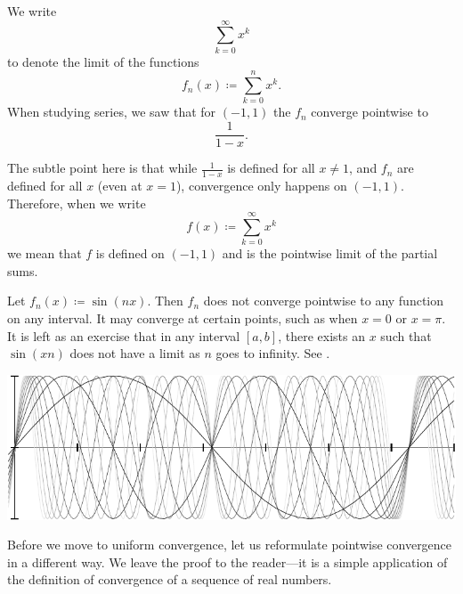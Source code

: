\begin{example} \label{example:geomsumptconv}
We write
\begin{equation*}
\sum_{k=0}^\infty x^k
\end{equation*}
to denote the limit of the functions
\begin{equation*}
f_n(x) \coloneqq \sum_{k=0}^n x^k .
\end{equation*}
When studying series, 
we saw that for $(-1,1)$ the $f_n$ converge pointwise to
\begin{equation*}
\frac{1}{1-x} .
\end{equation*}

The subtle point here is that while
$\frac{1}{1-x}$ is defined for all $x \not=1$, and $f_n$ are 
defined for all $x$ (even at $x=1$), convergence only happens on $(-1,1)$.
Therefore, when we write
\begin{equation*}
f(x) \coloneqq \sum_{k=0}^\infty x^k
\end{equation*}
we mean that $f$ is defined on $(-1,1)$ and is the pointwise limit
of the partial sums.
\end{example}

\begin{example}
Let $f_n(x) \coloneqq \sin(nx)$.  Then $f_n$ does not converge pointwise
to any function on any interval.  It may converge at certain points, such
as when $x=0$ or $x=\pi$.  It is left as an exercise that in any interval
$[a,b]$, there exists an $x$ such that $\sin(xn)$ does not have a limit
as $n$ goes to infinity.  See .
\begin{myfigureht}
\includegraphics{figures/nonconvsinxn}
\caption{Graphs of $\sin(nx)$ for
$n=1,2,\ldots,10$, with higher $n$ in lighter gray.%
\label{fig:nonconvsinxn}}
\end{myfigureht}
\end{example}

Before we move to uniform convergence, let us reformulate pointwise
convergence in a different way.
We leave the proof to the reader---it is a simple application of the
definition of convergence of a sequence of real numbers.

